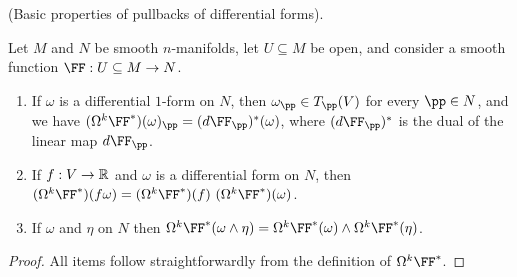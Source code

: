 \begin{theorem}
    (Basic properties of pullbacks of differential forms).
    
    Let $M$ and $N$ be smooth $n$-manifolds, let $U \subseteq M$ be open, and consider a smooth function $\FF:U \subseteq M \rightarrow N$.
    
    \begin{enumerate}
        \item If $\omega$ is a differential $1$-form on $N$, then $\omega_\pp \in T_\pp(V)$ for every $\pp \in N$, and we have $(\Omega^k \FF^*)(\omega)_\pp = (d\FF_\pp)^*(\omega)$, where $(d\FF_\pp)^*$ is the dual of the linear map $d\FF_\pp$.

        \item If $f:V \rightarrow \mathbb{R}$ and $\omega$ is a differential form on $N$, then ${(\Omega^k \FF^*)(f \omega) = (\Omega^k \FF^*)(f) \spc (\Omega^k \FF^*)(\omega)}$.
    
        \item If $\omega$ and $\eta$ on $N$ then $\Omega^k \FF^* (\omega \wedge \eta) = \Omega^k \FF^*(\omega) \wedge \Omega^k \FF^*(\eta)$.
        
        
        
    \end{enumerate}
\end{theorem}

\begin{proof}
    All items follow straightforwardly from the definition of $\Omega^k \FF^*$.
\end{proof}

